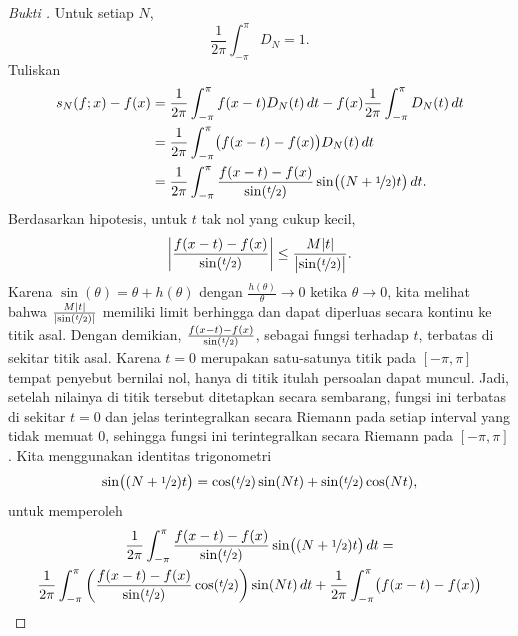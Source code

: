 \begin{proof}[Bukti ]
Untuk setiap $N$,
\begin{equation*}
\frac{1}{2\pi} \int_{-\pi}^\pi D_N = 1 .
\end{equation*}
Tuliskan
\begin{equation*}
\begin{split}
s_N(f;x)-f(x) & =
\frac{1}{2\pi} \int_{-\pi}^\pi f(x-t) D_N(t) \, dt 
-
f(x)
\frac{1}{2\pi} \int_{-\pi}^\pi D_N(t) \, dt
\\
& = 
\frac{1}{2\pi} \int_{-\pi}^\pi \bigl( f(x-t) - f(x) \bigr) D_N(t) \, dt 
\\
& = 
\frac{1}{2\pi} \int_{-\pi}^\pi \frac{f(x-t) - f(x)}{\sin(\nicefrac{t}{2})} \sin\bigl(
(N+\nicefrac{1}{2})t \bigr) \, dt .
\end{split}
\end{equation*}
Berdasarkan hipotesis,
untuk $t$ tak nol yang cukup kecil,
\begin{equation*}
\left\lvert { \frac{f(x-t) - f(x)}{\sin(\nicefrac{t}{2})} } \right\rvert
\leq
\frac{M\lvert {t} \rvert}{\bigl\lvert {\sin(\nicefrac{t}{2})} \bigr\rvert} .
\end{equation*}
Karena $\sin(\theta) = \theta + h(\theta)$ dengan $\frac{h(\theta)}{\theta} \to
0$ ketika $\theta \to 0$,
kita melihat bahwa
$\frac{M\lvert {t} \rvert}{\lvert {\sin(\nicefrac{t}{2})} \rvert}$ memiliki limit berhingga dan dapat diperluas secara kontinu ke
titik asal.
Dengan demikian,
$\frac{f(x-t) - f(x)}{\sin(\nicefrac{t}{2})}$, sebagai fungsi terhadap $t$,
terbatas di sekitar titik asal.
Karena $t=0$ merupakan satu-satunya titik pada $[-\pi,\pi]$ tempat penyebut bernilai nol,
hanya di titik itulah persoalan dapat muncul.
Jadi, setelah nilainya di titik tersebut ditetapkan secara sembarang, fungsi ini terbatas di sekitar $t=0$ dan jelas
terintegralkan secara Riemann pada setiap interval yang tidak memuat $0$, sehingga
fungsi ini terintegralkan secara Riemann pada $[-\pi,\pi]$.
Kita menggunakan identitas trigonometri
\begin{equation*}
\sin\bigl( (N+\nicefrac{1}{2})t \bigr)
=
\cos(\nicefrac{t}{2}) \sin(Nt) + 
\sin(\nicefrac{t}{2}) \cos(Nt) ,
\end{equation*}
untuk memperoleh
\begin{multline*}
\frac{1}{2\pi} \int_{-\pi}^\pi \frac{f(x-t) - f(x)}{\sin(\nicefrac{t}{2})} \sin\bigl(
(N+\nicefrac{1}{2})t \bigr) \, dt 
= \\
\frac{1}{2\pi} \int_{-\pi}^\pi
\left( \frac{f(x-t) - f(x)}{\sin(\nicefrac{t}{2})}
\cos (\nicefrac{t}{2}) \right) \sin (Nt) \, dt
+
\frac{1}{2\pi} \int_{-\pi}^\pi \bigl( f(x-t) - f(x) \bigr)

\end{multline*}
\end{proof}
